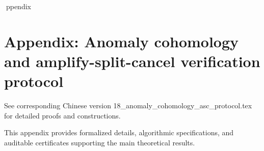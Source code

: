 ppendix

\section*{Appendix: Anomaly cohomology and amplify-split-cancel verification protocol}

See corresponding Chinese version 18_anomaly_cohomology_asc_protocol.tex for detailed proofs and constructions.

This appendix provides formalized details, algorithmic specifications, and auditable certificates supporting the main theoretical results.
